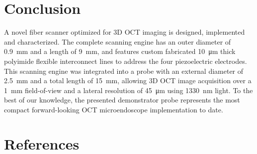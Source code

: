 \documentclass[10pt]{iopart}
\begin{document}
\section{Conclusion}

A novel fiber scanner optimized for 3D OCT imaging is designed, implemented and characterized. The complete scanning engine has an outer diameter of \SI{0.9}{\milli\meter} and a length of \SI{9}{\milli\meter}, and features custom fabricated \SI{10}{\micro\meter} thick polyimide flexible interconnect lines to address the four piezoelectric electrodes. This scanning engine was integrated into a probe with an external diameter of \SI{2.5}{\milli\meter} and a total length of \SI{15}{\milli\meter}, allowing 3D OCT image acquisition over a \SI{1}{\milli\meter} field-of-view and a lateral resolution of \SI{45}{\micro\meter} using \SI{1330}{\nano\meter} light. To the best of our knowledge, the presented demonstrator probe represents the most compact forward-looking OCT microendoscope implementation to date.

\section*{References}






\end{document}
